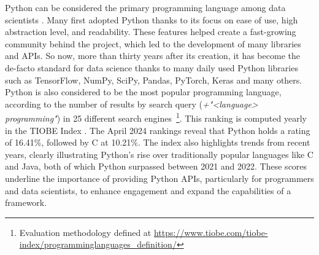 Python can be considered the primary programming language among data scientists \cite{Python_CS-R9526}. Many first adopted Python thanks to its focus on ease of use, high abstraction level, and readability. These features helped create a fast-growing community behind the project, which led to the development of many libraries and \glspl{API}. So now, more than thirty years after its creation, it has become the de-facto standard for data science thanks to many daily used Python libraries such as TensorFlow, NumPy, SciPy, Pandas, PyTorch, Keras and many others. Python is also considered to be the most popular programming language, according to the number of results by search query (\textit{+"<language> programming"}) in 25 different search engines~\footnote{Evaluation methodology defined at \url{https://www.tiobe.com/tiobe-
index/programminglanguages_definition/}}. This ranking is computed yearly in the TIOBE Index \cite{TIOBEIndex}. The April 2024 rankings reveal that Python holds a rating of 16.41\%, followed by C at 10.21\%. The index also highlights trends from recent years, clearly illustrating Python's rise over traditionally popular languages like C and Java, both of which Python surpassed between 2021 and 2022. These scores underline the importance of providing Python \glspl{API}, particularly for programmers and data scientists, to enhance engagement and expand the capabilities of a framework.
